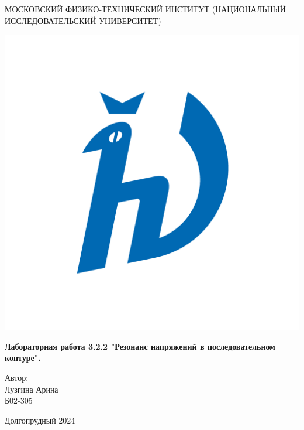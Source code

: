 \documentclass[12pt]{article}
\begin{document}
	\begin{titlepage}
		\begin{center}
			{\large МОСКОВСКИЙ ФИЗИКО-ТЕХНИЧЕСКИЙ ИНСТИТУТ (НАЦИОНАЛЬНЫЙ ИССЛЕДОВАТЕЛЬСКИЙ УНИВЕРСИТЕТ)}
		\end{center}
		
		\vspace{1.5cm}
		
		\begin{center}
			\includegraphics[width=0.4\linewidth]{images/hv_full.png}
		\end{center}
		\vspace{0.1cm}
		{\huge
			\begin{center}
				{\bf Лабораторная работа 3.2.2 "Резонанс напряжений в последовательном контуре".}
			\end{center}
		}
		\vspace{2cm}
		\begin{flushright}
			{\LARGE Автор:\\ Лузгина Арина \\
				\vspace{0.2cm}
				Б02-305}
		\end{flushright}
		\vspace{3.5cm}
		\begin{center}
			Долгопрудный 2024
		\end{center}
	\end{titlepage}
\end{document}

